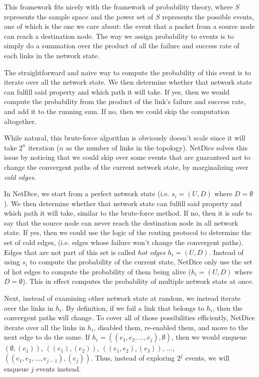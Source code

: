 \documentclass[10pt,sigconf,letterpaper,anonymous,nonacm]{acmart}
\begin{document}
This framework fits nicely with the framework of probability theory, where $S$ represents the 
sample space and the power set of $S$ represents the possible events, one of which is the one
we care about: the event that a packet from a source node can reach a destination node.
The way we assign probability to events is to simply do a summation over the product of all the 
failure and success rate of each links in the network state.

The straightforward and naive way to compute the probability of this event is to iterate over all 
the network state. 
We then determine whether that network state can fulfill said property and which path it will 
take. 
If yes, then we would compute the probability from the product of the link's failure and success 
rate, and add it to the running sum.
If no, then we could skip the computation altogether.

While natural, this brute-force algorithm is obviously doesn't scale since it will take $2^n$ 
iteration ($n$ as the number of links in the topology). 
NetDice \cite{steffen2020probabilistic} solves this issue by noticing that we could skip over some 
events that are guaranteed not to change the convergent paths of the current network state, by 
marginalizing over \textit{cold edges}.

In NetDice, we start from a perfect network state (i.e. $s_i = (U, D)$ where $D = \emptyset$).
We then determine whether that network state can fulfill said property and which path it will 
take, similar to the brute-force method.
If no, then it is safe to say that the source node can never reach the destination node in all 
network state.
If yes, then we could use the logic of the routing protocol to determine the set of cold edges, 
(i.e. edges whose failure won't change the convergent paths). 
Edges that are not part of this set is called \textit{hot edges} $h_i = (U, D)$.
Instead of using $s_i$ to compute the probability of the current state, NetDice only use the set 
of hot edges to compute the probability of them being alive ($h_i = (U, D)$ where $D = \emptyset$).
This in effect computes the probability of multiple network state at once.

Next, instead of examining other network state at random, we instead iterate over the links in 
$h_i$.
By definition, if we fail a link that belongs to $h_i$, then the convergent paths will change.
To cover all of those possibilities efficiently, NetDice iterate over all the links in $h_i$, 
disabled them, re-enabled them, and move to the next edge to do the same.
If $h_i = ((e_1, e_2, ..., e_j), \emptyset)$, then we would enqueue $(\emptyset, (e_1))$, 
$((e_1), (e_2))$, $((e_1, e_2), (e_3))$, ..., $((e_1, e_2, ..., e_{j-1}), (e_j))$.
Thus, instead of exploring $2^j$ events, we will enqueue $j$ events instead. 
\end{document}
